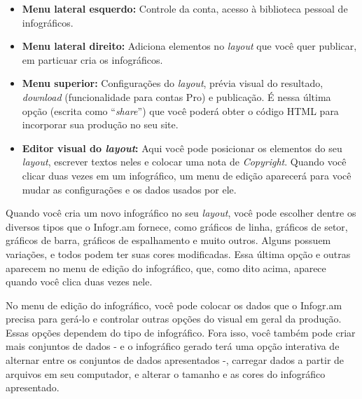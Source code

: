 \documentclass[12pt,onecolumn]{article}
\begin{document}
    \begin{itemize}
      \item
        \textbf{Menu lateral esquerdo:}
        Controle da conta, acesso à biblioteca pessoal de
        infográficos.
      \item
        \textbf{Menu lateral direito:}
        Adiciona elementos no \textit{layout} que você quer
        publicar, em particuar cria os infográficos.
      \item
        \textbf{Menu superior:}
        Configurações do \textit{layout}, prévia visual do resultado,
        \textit{download} (funcionalidade para contas Pro) e publicação. É nessa
        última opção (escrita como ``\textit{share}'') que você poderá obter o
        código HTML para incorporar sua produção no seu site.
      \item
        \textbf{Editor visual do \textit{layout}:}
        Aqui você pode posicionar os elementos do seu \textit{layout}, escrever
        textos neles e colocar uma nota de \textit{Copyright}. Quando você clicar
        duas vezes em um infográfico, um menu de edição aparecerá para você mudar
        as configurações e os dados usados por ele.
    \end{itemize}
    
    Quando você cria um novo infográfico no seu \textit{layout}, você pode
    escolher dentre os diversos tipos que o Infogr.am fornece, como gráficos de
    linha, gráficos de setor, gráficos de barra, gráficos de espalhamento e
    muito outros. Alguns possuem variações, e todos podem ter suas cores
    modificadas. Essa última opção e outras aparecem no menu de edição do
    infográfico, que, como dito acima, aparece quando você clica duas vezes
    nele.
    
    No menu de edição do infográfico, você pode colocar os dados que o Infogr.am
    precisa para gerá-lo e controlar outras opções do visual em geral da
    produção. Essas opções dependem do tipo de infográfico. Fora isso, você
    também pode criar mais conjuntos de dados - e o infográfico gerado terá uma
    opção interativa de alternar entre os conjuntos de dados apresentados -,
    carregar dados a partir de arquivos em seu computador, e alterar o tamanho e
    as cores do infográfico apresentado.
    
\end{document}
